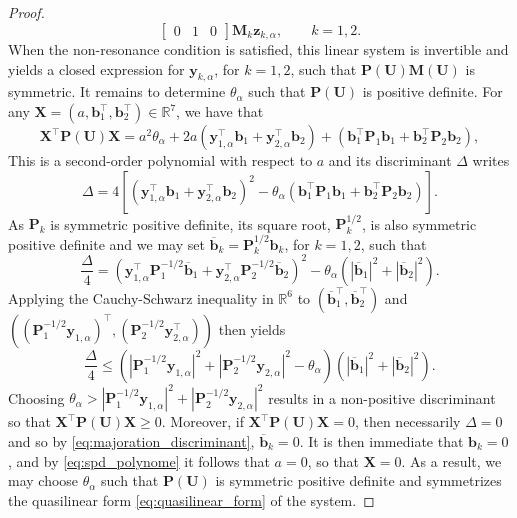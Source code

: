 \documentclass{myclass}
\newcommand{\mtrx}[1]{\mathbf{#1}}
\newcommand{\pth}[1]  {\left( #1 \right)}
\newcommand{\brck}[1]  {\left[ #1 \right]}
\begin{document}
\begin{proof}
\begin{equation}
\begin{bmatrix}
0 & 1 & 0 
\end{bmatrix}
\mtrx{M}_k \bm{z}_{k,\alpha}, \qquad k=1,2.
\end{equation}
When the non-resonance condition is satisfied, this linear system is invertible and yields a closed expression for $\bm{y}_{k,\alpha}$, for $k=1,2$, such that $\mtrx{P}(\bm{U})\mtrx{M}(\bm{U})$ is symmetric. It remains to determine $\theta_\alpha$ such that $\mtrx{P}(\bm{U})$ is positive definite. For any $\bm{X}=(a,\bm{b}_1^\top,\bm{b}_2^\top)\in\mathbb{R}^7$, we have that
\begin{equation}
\bm{X}^\top \mtrx{P}(\bm{U}) \bm{X}  
= a^2 \theta_\alpha + 2a\pth{\bm{y}_{1,\alpha}^\top\bm{b}_1 + \bm{y}_{2,\alpha}^\top\bm{b}_2} + \pth{\bm{b}_1^\top\mtrx{P}_1\bm{b}_1 + \bm{b}_2^\top\mtrx{P}_2\bm{b}_2},\label{eq:spd_polynome}
\end{equation}
This is a second-order polynomial with respect to $a$ and its discriminant $\Delta$ writes
\begin{equation}
\Delta = 4\brck{\pth{\bm{y}_{1,\alpha}^\top\bm{b}_1 + \bm{y}_{2,\alpha}^\top\bm{b}_2}^2 - \theta_\alpha\pth{\bm{b}_1^\top\mtrx{P}_1\bm{b}_1 + \bm{b}_2^\top\mtrx{P}_2\bm{b}_2}}.
\end{equation}
As $\mtrx{P}_k$ is symmetric positive definite, its square root, $\mtrx{P}_k^{1/2}$, is also symmetric positive definite and we may set $\overline{\bm{b}}_k = \mtrx{P}_k^{1/2}\bm{b}_k$, for $k=1,2$, such that
\begin{equation}
\frac{\Delta}{4} = \pth{\bm{y}_{1,\alpha}^\top\mtrx{P}_1^{-1/2}\overline{\bm{b}}_1 + \bm{y}_{2,\alpha}^\top\mtrx{P}_2^{-1/2}\overline{\bm{b}}_2}^2 - \theta_\alpha \pth{ |\overline{\bm{b}}_1|^2 + |\overline{\bm{b}}_2|^2}.
\end{equation}
Applying the Cauchy-Schwarz inequality in $\mathbb{R}^6$ to $\pth{\overline{\bm{b}}_1^\top,\overline{\bm{b}}_2^\top}$ and $\pth{(\mtrx{P}_1^{-1/2}\bm{y}_{1,\alpha})^\top,(\mtrx{P}_2^{-1/2}\bm{y}_{2,\alpha}^\top)}$ then yields
\begin{equation}
\frac{\Delta}{4} \leq  \pth{\left|\mtrx{P}_1^{-1/2}\bm{y}_{1,\alpha}\right|^2 + \left|\mtrx{P}_2^{-1/2}\bm{y}_{2,\alpha}\right|^2 - \theta_\alpha} \pth{ |\overline{\bm{b}}_1|^2 + |\overline{\bm{b}}_2|^2}.
\label{eq:majoration_discriminant}
\end{equation}
Choosing $\theta_\alpha >\left|\mtrx{P}_1^{-1/2}\bm{y}_{1,\alpha}\right|^2 + \left|\mtrx{P}_2^{-1/2}\bm{y}_{2,\alpha}\right|^2$ results in a non-positive discriminant so that $\bm{X}^\top\mtrx{P}(\bm{U})\bm{X}\geq0$. Moreover, if $\bm{X}^\top\mtrx{P}(\bm{U})\bm{X}=0$, then necessarily $\Delta=0$ and so by \eqref{eq:majoration_discriminant}, $\overline{\bm{b}}_k=0$. It is then immediate that $\bm{b}_k=0$, and by \eqref{eq:spd_polynome} it follows that $a=0$, so that $\bm{X}=0$. As a result, we may choose $\theta_\alpha$ such that $\mtrx{P}(\bm{U})$ is symmetric positive definite and symmetrizes the quasilinear form \eqref{eq:quasilinear_form} of the system.
\end{proof}
\end{document}
